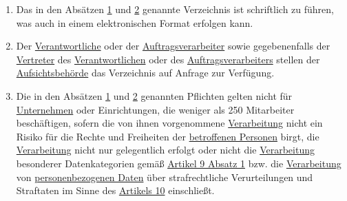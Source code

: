 \begin{enumerate}
\begin{enumerate}
  \end{enumerate}

  \item Das in den Absätzen \hyperref[itm:30-1]{1} und \hyperref[itm:30-2]{2} genannte Verzeichnis ist schriftlich zu
   führen, was auch in einem elektronischen Format erfolgen kann.
  \label{itm:30-3}

  \item Der \hyperref[itm:04-7]{Verantwortliche} oder der \hyperref[itm:04-8]{Auftragsverarbeiter} sowie gegebenenfalls
   der \hyperref[itm:04-17]{Vertreter} des \hyperref[itm:04-7]{Verantwortlichen} oder des \hyperref[itm:04-8]
   {Auftragsverarbeiters} stellen der \hyperref[itm:04-21]{Aufsichtsbehörde} das Verzeichnis auf Anfrage zur
   Verfügung.
  \label{itm:30-4}

  \item Die in den Absätzen \hyperref[itm:30-1]{1} und \hyperref[itm:30-2]{2} genannten Pflichten gelten nicht für
   \hyperref[itm:04-18]{Unternehmen} oder Einrichtungen, die weniger als 250 Mitarbeiter beschäftigen, sofern die von
    ihnen vorgenommene
   \hyperref[itm:04-2]{Verarbeitung} nicht ein Risiko für die Rechte und Freiheiten der \hyperref[itm:04-1]
    {betroffenen Personen} birgt, die \hyperref[itm:04-2]{Verarbeitung} nicht nur gelegentlich erfolgt oder nicht
    die \hyperref[itm:04-2]{Verarbeitung} besonderer Datenkategorien gemäß \hyperref[itm:09-1]{Artikel 9 Absatz 1} bzw.
    die  \hyperref[itm:04-2]{Verarbeitung} von \hyperref[itm:04-1]{personenbezogenen Daten} über strafrechtliche
    Verurteilungen und Straftaten im Sinne des \hyperref[ch:10]{Artikels 10} einschließt.
  \label{itm:30-5}

\end{enumerate}


